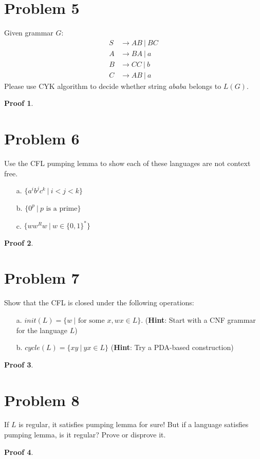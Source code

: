 \documentclass[a4paper,UTF8]{article}
\theoremstyle{definition}
\newtheorem*{prove}{Proof}
\begin{document}
\section*{Problem 5}
Given grammar $G$:
\[
\begin{aligned}
  S & \rightarrow AB\ |\ BC \\
  A & \rightarrow BA\ |\ a \\
  B & \rightarrow CC\ |\ b \\
  C & \rightarrow AB\ |\ a
\end{aligned}
\]
Please use CYK algorithm to decide whether string $ababa$ belongs to $L(G)$.
\begin{prove}
\end{prove}
\newpage

\section*{Problem 6}
Use the CFL pumping lemma to show each of these languages are not context free.
\begin{enumerate}
  \item[a.] $\{a^ib^jc^k\ |\ i < j < k\}$
  \item[b.] $\{0^p\ |\ p\mbox{ is a prime}\}$
  \item[c.] $\{ww^Rw\ |\ w \in \{0,1\}^* \}$
\end{enumerate}
\begin{prove}
\end{prove}
\newpage

\section*{Problem 7}
Show that the CFL is closed under the following operations:
\begin{enumerate}
  \item[a.] $init(L)=\{w\ |\mbox{ for some }x, wx \in L\}$. (\textbf{Hint}: Start with a CNF grammar for the language $L$)
  \item[b.] $cycle(L)=\{xy\ |\ yx \in L\}$ (\textbf{Hint}: Try a PDA-based construction)
\end{enumerate}
\begin{prove}
\end{prove}
\newpage

\section*{Problem 8}
If $L$ is regular, it satisfies pumping lemma for sure! But if a language satisfies pumping lemma, is it regular? Prove or disprove it.
\begin{prove}
\end{prove}
\end{document}
